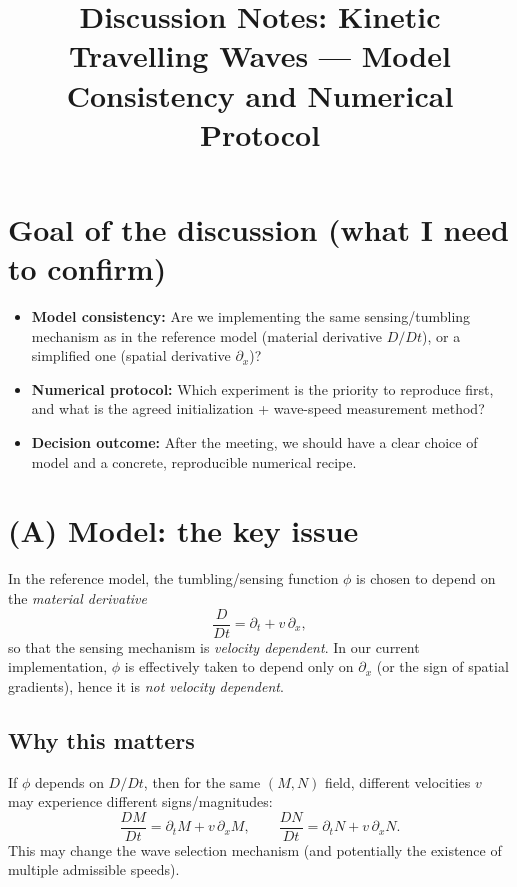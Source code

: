 \documentclass[11pt]{article}
\title{Discussion Notes: Kinetic Travelling Waves --- Model Consistency and Numerical Protocol}
\author{}
\date{}
\begin{document}
\maketitle

\vspace{-1em}
\section*{Goal of the discussion (what I need to confirm)}
\begin{itemize}[leftmargin=1.4em]
\item \textbf{Model consistency:} Are we implementing the same sensing/tumbling mechanism as in the reference model (material derivative $D/Dt$), or a simplified one (spatial derivative $\partial_x$)?
\item \textbf{Numerical protocol:} Which experiment is the priority to reproduce first, and what is the agreed initialization + wave-speed measurement method?
\item \textbf{Decision outcome:} After the meeting, we should have a clear choice of model and a concrete, reproducible numerical recipe.
\end{itemize}

\section*{(A) Model: the key issue}
In the reference model, the tumbling/sensing function $\phi$ is chosen to depend on the \emph{material derivative}
\begin{equation}\label{eq:material}
\frac{D}{Dt} = \partial_t + v\,\partial_x,
\end{equation}
so that the sensing mechanism is \emph{velocity dependent}. In our current implementation, $\phi$ is effectively taken to depend only on $\partial_x$ (or the sign of spatial gradients), hence it is \emph{not velocity dependent}.

\subsection*{Why this matters}
If $\phi$ depends on $D/Dt$, then for the same $(M,N)$ field, different velocities $v$ may experience different signs/magnitudes:
\begin{equation}\label{eq:sense}
\frac{DM}{Dt} = \partial_t M + v\,\partial_x M,
\qquad
\frac{DN}{Dt} = \partial_t N + v\,\partial_x N.
\end{equation}
This may change the wave selection mechanism (and potentially the existence of multiple admissible speeds).
\end{document}
